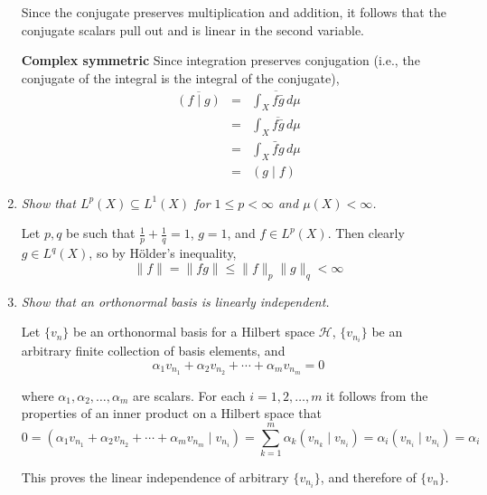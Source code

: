 \documentclass[letterpaper,11pt]{article}
\begin{document}
\begin{enumerate}
Since the conjugate preserves multiplication and addition, it follows that the conjugate scalars pull out and is linear in the second variable.

\textbf{Complex symmetric}  Since integration preserves conjugation (i.e., the conjugate of the integral is the integral of the conjugate),
\begin{eqnarray*}
\overline{(f \mid g)} &=& \overline{\int_X f\bar{g} \,d\mu} \\
&=& \int_X \overline{f\bar{g}} \,d\mu \\
&=& \int_X \bar{f}g \,d\mu \\
&=& (g \mid f)
\end{eqnarray*}
\item \emph{Show that $L^p(X) \subseteq L^1(X)$ for $1 \leq p < \infty$ and $\mu(X) < \infty$.}

Let $p,q$ be such that $\frac{1}{p} + \frac{1}{q} = 1$, $g = 1$, and $f \in L^p(X)$.  Then clearly $g \in L^q(X)$, so by H\"{o}lder's inequality,
\[
\|f\| = \|fg\| \leq \|f\|_p \|g\|_q < \infty
\]

\item \emph{Show that an orthonormal basis is linearly independent.}

Let $\{v_n\}$ be an orthonormal basis for a Hilbert space $\mathcal{H}$, $\{v_{n_i}\}$ be an arbitrary finite collection of basis elements, and
\[
\alpha_1 v_{n_1} + \alpha_2 v_{n_2} + \cdots + \alpha_m v_{n_m} = 0
\]

where $\alpha_1,\alpha_2,\ldots,\alpha_m$ are scalars.  For each $i=1,2,\ldots,m$ it follows from the properties of an inner product on a Hilbert space that
\[
0 = (\alpha_1 v_{n_1} + \alpha_2 v_{n_2} + \cdots + \alpha_m v_{n_m} \mid v_{n_i}) = \sum_{k=1}^m \alpha_k (v_{n_k} \mid v_{n_i}) = \alpha_i (v_{n_i} \mid v_{n_i}) = \alpha_i
\]

This proves the linear independence of arbitrary $\{v_{n_i}\}$, and therefore of $\{v_n\}$.
\end{enumerate}
\end{document}
